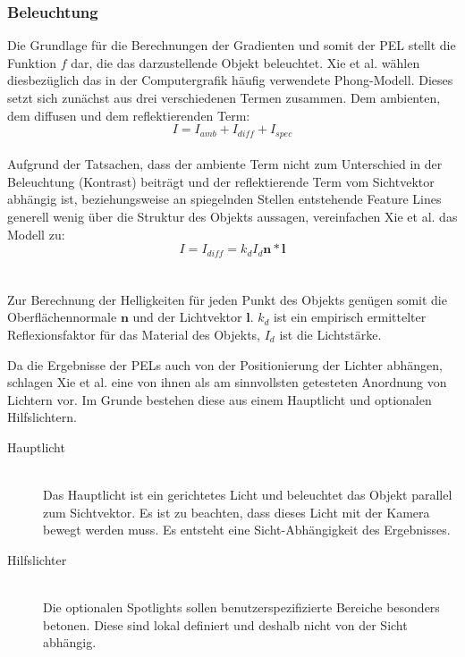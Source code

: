 \documentclass{paperStyle}
\begin{document}
\subsubsection{Beleuchtung}
Die Grundlage für die Berechnungen der Gradienten und somit der PEL stellt die Funktion $f$ dar, die das darzustellende Objekt beleuchtet.
Xie et al. wählen diesbezüglich das in der Computergrafik häufig verwendete Phong-Modell.
Dieses setzt sich zunächst aus drei verschiedenen Termen zusammen. Dem ambienten, dem diffusen und dem reflektierenden Term:
\begin{equation}
I = I_{amb} + I_{diff} + I_{spec}
\end{equation}
\\
Aufgrund der Tatsachen, dass der ambiente Term nicht zum Unterschied in der Beleuchtung (Kontrast) beiträgt und der reflektierende Term vom Sichtvektor abhängig ist, beziehungsweise an spiegelnden Stellen entstehende Feature Lines generell wenig über die Struktur des Objekts aussagen, vereinfachen Xie et al. das Modell zu:
\begin{equation}
I = I_{diff} = k_{d}I_{d}\mathbf{n}*\mathbf{l}
\end{equation}
\\\\
Zur Berechnung der Helligkeiten für jeden Punkt des Objekts genügen somit die Oberflächennormale $\mathbf{n}$ und der Lichtvektor $\mathbf{l}$. $k_{d}$ ist ein empirisch ermittelter Reflexionsfaktor für das Material des Objekts, $I_{d}$ ist die Lichtstärke.

\label{belfkt}
Da die Ergebnisse der PELs auch von der Positionierung der Lichter abhängen, schlagen Xie et al. eine von ihnen als am sinnvollsten getesteten Anordnung von Lichtern vor. Im Grunde bestehen diese aus einem Hauptlicht und optionalen Hilfslichtern.
\begin{description}
\item[Hauptlicht]\hfill \\
Das Hauptlicht ist ein gerichtetes Licht und beleuchtet das Objekt parallel zum Sichtvektor. Es ist zu beachten, dass dieses Licht mit der Kamera bewegt werden muss. Es entsteht eine Sicht-Abhängigkeit des Ergebnisses. \\
\item[Hilfslichter]\hfill \\
Die optionalen Spotlights sollen benutzerspezifizierte Bereiche besonders betonen. Diese sind lokal definiert und deshalb nicht von der Sicht abhängig.
\end{description}
\end{document}
